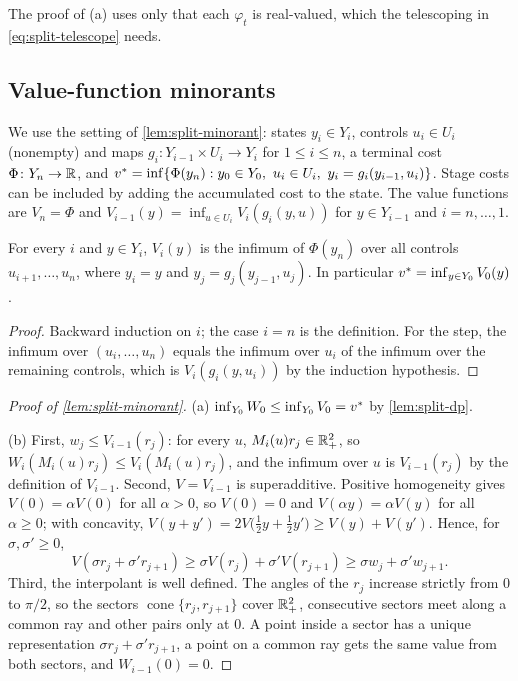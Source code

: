 The proof of (a) uses only that each $\varphi_t$ is real-valued, which the
telescoping in \eqref{eq:split-telescope} needs.

\subsection{Value-function minorants}\label{app:splitproofs-minorant}

We use the setting of \cref{lem:split-minorant}: states $y_i\in Y_i$, controls
$u_i\in U_i$ (nonempty) and maps $g_i\colon Y_{i-1}\times U_i\to Y_i$ for
$1\le i\le n$, a terminal cost $\Phi\colon Y_n\to\mathbb{R}$, and
$\vstar=\inf\{\Phi(y_n):y_0\in Y_0,\ u_i\in U_i,\ y_i=g_i(y_{i-1},u_i)\}$.
Stage costs can be included by adding the accumulated cost to the state.
The value functions are $V_n=\Phi$ and
$V_{i-1}(y)=\inf_{u\in U_i}V_i(g_i(y,u))$ for $y\in Y_{i-1}$ and
$i=n,\dots,1$.

\begin{lemma}\label{lem:split-dp}
For every $i$ and $y\in Y_i$, $V_i(y)$ is the infimum of $\Phi(y_n)$ over all
controls $u_{i+1},\dots,u_n$, where $y_i=y$ and $y_j=g_j(y_{j-1},u_j)$.
In particular $v^{*}=\inf_{y\in Y_0}V_0(y)$.
\end{lemma}

\begin{proof}
Backward induction on $i$; the case $i=n$ is the definition.
For the step, the infimum over $(u_i,\dots,u_n)$ equals the infimum over $u_i$
of the infimum over the remaining controls, which is
$V_i(g_i(y,u_i))$ by the induction hypothesis.
\end{proof}

\begin{proof}[Proof of \cref{lem:split-minorant}]
(a) $\inf_{Y_0}W_0\le\inf_{Y_0}V_0=v^{*}$ by \cref{lem:split-dp}.

(b) First, $w_j\le V_{i-1}(r_j)$: for every $u$, $M_i(u)r_j\in\mathbb{R}^2_+$, so
$W_i(M_i(u)r_j)\le V_i(M_i(u)r_j)$, and the infimum over $u$ is
$V_{i-1}(r_j)$ by the definition of $V_{i-1}$.
Second, $V=V_{i-1}$ is superadditive.
Positive homogeneity gives $V(0)=\alpha V(0)$ for all $\alpha>0$, so $V(0)=0$
and $V(\alpha y)=\alpha V(y)$ for all $\alpha\ge0$; with concavity,
$V(y+y')=2V\bigl(\tfrac12y+\tfrac12y'\bigr)\ge V(y)+V(y')$.
Hence, for $\sigma,\sigma'\ge0$,
\[
  V(\sigma r_j+\sigma'r_{j+1})\ge\sigma V(r_j)+\sigma'V(r_{j+1})
  \ge\sigma w_j+\sigma'w_{j+1}.
\]
Third, the interpolant is well defined.
The angles of the $r_j$ increase strictly from $0$ to $\pi/2$, so the sectors
$\operatorname{cone}\{r_j,r_{j+1}\}$ cover $\mathbb{R}^2_+$, consecutive sectors meet
along a common ray and other pairs only at $0$.
A point inside a sector has a unique representation
$\sigma r_j+\sigma'r_{j+1}$, a point on a common ray gets the same value from
both sectors, and $W_{i-1}(0)=0$.
\end{proof}

